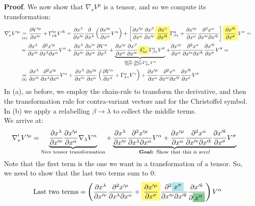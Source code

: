 \documentclass[../template.tex]{subfiles}
\begin{document}
\textbf{Proof}. We now show that $\nabla_\nu V^\mu$ is a tensor, and so we compute its transformation:
\begin{align*}
    \nabla_\nu' V'^\mu &\underset{(a)}{=}  \pdv{V'^\mu}{x'^\nu} + \Gamma'^\mu_{\nu k} V'^k = \pdv{x^\lambda}{x'^\nu} \pdv{x^\lambda} \left(\pdv{x'^\mu}{x^\alpha}V^\alpha\right)+ \left[\pdv{x'^\mu}{x^\alpha} \pdv{x^\beta}{x'^\nu} \hlc{Yellow}{\pdv{x^\gamma}{x'^k}} \Gamma^\alpha_{\beta \gamma} + \pdv{x'^\mu}{x^\alpha} \pdv{x^\alpha}{x'^\nu}{x'^k}\right] \hlc{Yellow}{\pdv{x'^k}{x^\sigma}} V^\sigma =\\
    &= \pdv{x^\lambda}{x'^\nu} \pdv{x'^\mu}{x^\lambda}{x^\alpha} V^\alpha + \pdv{x^\lambda}{x'^\nu} \pdv{x'^\nu}{x^\alpha} \pdv{V^\alpha}{x^\lambda} + \underbrace{\pdv{x'^\mu}{x^\alpha}\pdv{x^\beta}{x'^\nu} \hlc{Yellow}{\delta^\gamma_{\diamond \sigma} }\Gamma^\alpha_{\beta \gamma}V^\sigma}_{\pdv{x'^\mu}{x^\alpha} \pdv{x^\beta}{x'^\nu} \Gamma^\alpha_{\beta \sigma} V^\sigma} + \pdv{x'^\mu}{x^\alpha}\pdv{x^\alpha}{x'^\nu}{x'^k} \pdv{x'^k}{x^\sigma} V^\sigma =\\
    &\underset{(b)}{=}  \pdv{x^\lambda}{x'^\nu} \pdv{x'^\mu}{x^\lambda}{x^\alpha} V^\alpha + \pdv{x^\lambda}{x'^\nu} \pdv{x'^\mu}{x^\alpha}\left(\pdv{V^\alpha}{x^\lambda} + \Gamma^\alpha_{\lambda \gamma} V^\gamma \right) + \pdv{x'^\mu}{x^\alpha} \pdv{x^\alpha}{x'^\nu}{x'^k} \pdv{x'^k}{x^\sigma} V^\sigma 
\end{align*}  
In (a), as before, we employ the chain-rule to transform the derivative, and then the transformation rule for contra-variant vectors and for the Christoffel symbol.\\
In (b) we apply a relabelling $\beta \to \lambda$ to collect the middle terms.\\
We arrive at:
\begin{align*}
    \nabla_\nu' V'^\mu &= \underbrace{\pdv{x^\lambda}{x'^\nu} \pdv{x'^\mu}{x^\alpha} \nabla_{\lambda}V^\alpha }_{\text{Nice tensor transformation}}+ \underbrace{\pdv{x^\lambda}{x'^\nu} \pdv{x'^\mu}{x^\lambda}{x^\alpha}V^\alpha + \pdv{x'^\mu}{x^\alpha} \pdv{x^\alpha}{x'^\nu}{x'^k} \pdv{x'^k}{x^\sigma}V^\sigma}_{\textbf{Goal: } \text{Show that this is zero!}}
\end{align*}
Note that the first term is the one we want in a transformation of a tensor. So, we need to show that the last two terms sum to $0$:
\begin{align*}
    \text{Last two terms} = \left(\pdv{x^\lambda}{x'^\nu} \pdv{x'^\mu}{x^\lambda}{x^\alpha} + \hlc{Yellow}{\pdv{x'^\mu}{x^\sigma}} \pdv{\hlc{SkyBlue}{x^\sigma}}{x'^\nu}{x'^k} \pdv{x'^k}{\hlc{ForestGreen}{x^\alpha}}\right)V^\alpha
\end{align*}
\end{document}
